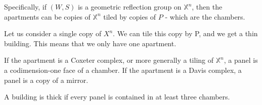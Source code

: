 \documentclass[11pt]{article}
\begin{document}
Specifically, if $(W,S)$ is a geometric reflection group on $\mathbb{X}^n$, then the apartments can be copies of $\mathbb{X}^n$ tiled by copies of $P$ - which are the chambers. 

\begin{example}
    Let us consider a single copy of $X^n$. We can tile this copy by P, and we get a thin building. This means that we only have one apartment. 
\end{example}

\begin{definition}
If the apartment is a Coxeter complex, or more generally a tiling of $\mathbb{X}^n$, a panel is a codimension-one face of a chamber. If the apartment is a Davis complex, a panel is a copy of a mirror.
\end{definition}

\begin{definition}
    A building is thick if every panel is contained in at least three chambers.
\end{definition}
\end{document}
